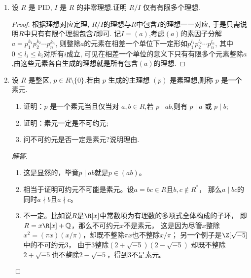 \begin{enumerate}
\begin{proof}
    设$(a_1)\subset(a_2)\subset(a_3)\subset\cdots$是一条$P_I$中的主理想升链,则有$a_2|a_1,a_3|a_2,\cdots$,
    考虑$a_1$的素因子分解$a_1=p_1^{k^{(1)}_1}p_2^{k^{(1)}_2}\cdots p_n^{k^{(1)}_n}$,
    则由整除关系,可知对于每个$m$, $a_m$的素因子分解在相差一个单位下一定形如$a_m=p_1^{k^{(m)}_1}p_2^{k^{(m)}_2}\cdots p_n^{k^{(m)}_n}$,
    并且对于每个$i$,非负整数列$\big\{k^{(m)}_i\big\}$都关于$m$单调不增,从而一定存在最小值,记作$k_i$,
    令$a=p_1^{k_1}p_2^{k_2}\cdots p_n^{k_n}$,可见$(a)$是这条链的上界.
    进一步, 由于$\bigcup\limits_{i\geqslant1}(a_i)=(a)$, 
    一定存在某个$(a_n)$, 使得$a\in(a_n)$, 于是$(a_n)=(a)$, 故这条链会在第$n$步停止.
    
    断言$P_I$有极大元: 若不然,任取一个$(a_1)$, 可以找到一个$(a_2)$使得$(a_1)\subset(a_2)$, 
    重复下去就得到一条无限长的升链, 与前断言矛盾. 记一个极大元为$(b)$, 只需说明$(b)=I$即可,
    若不然,存在$c\in I,c\notin (b)$,记$(d)=(c)+(b)$,则$(b)\subset(d)\subset I$,与$(b)$的极大性矛盾.
\end{proof}

\item 设 $ R $ 是 PID, $ I $ 是 $ R $ 的非零理想.证明 $ R/I $ 仅有有限多个理想.
\begin{proof}
    根据理想对应定理, $R/I$的理想与$R$中包含$I$的理想一一对应,
    于是只需说明$R$中只有有限个理想包含$I$即可.
    记$I=(a)$,考虑$(a)$的素因子分解$a=p_1^{k_1}p_2^{k_2}\cdots p_n^{k_n}$,
    则整除$a$的元素在相差一个单位下一定形如$p_1^{l_1}p_2^{l_2}\cdots p_n^{l_n}$,
    其中$0\leqslant l_i\leqslant k_i$对所有$i$成立,
    可见在相差一个单位的意义下只有有限多个元素整除$a$,由这些元素各自生成的理想就是所有包含$(a)$的理想.
\end{proof}

\item 设 $ R $ 是整区, $ p \in R \setminus \{0\} $.若由 $ p $ 生成的主理想 $(p)$ 是素理想,则称 $ p $ 是一个素元.
\begin{enumerate}[label=(\arabic*)]
    \item 证明：$ p $ 是一个素元当且仅当对 $ a, b \in R $,若 $ p \mid ab $,则有 $ p \mid a $ 或 $ p \mid b $;
    \item 证明：素元一定是不可约元;
    \item 问不可约元是否一定是素元?说明理由.
\end{enumerate}
\begin{proof}[解答]
    \begin{enumerate}[label=(\arabic*)]
    \item 这是显然的，毕竟$p \mid ab$就是$p\in(ab)$。
    \item 相当于证明可约元不可能是素元。设$a=bc \in R$且$b,c \notin R^*$，
    那么$a \mid bc$的同时$a \nmid b$且$a \nmid c$。
    \item 不一定。比如说$R$是$\R[x]$中常数项为有理数的多项式全体构成的子环，
    即$R=x\R[x]+\mathbb{Q}$，那么不可约元$x$不是素元，
    这是因为尽管$x$整除$x^2=(\pi x)(x/\pi)$，却既不整除$\pi x$也不整除$x/\pi$；
    另一个例子是$\Z[\sqrt{-5}]$中的不可约元$3$，
    由于$3$整除$(2+\sqrt{-5})(2-\sqrt{-5})$
    却既不整除$2+\sqrt{-5}$也不整除$2-\sqrt{-5}$，得到$3$不是素元。\qedhere
    \end{enumerate}
\end{proof}


\end{enumerate}

